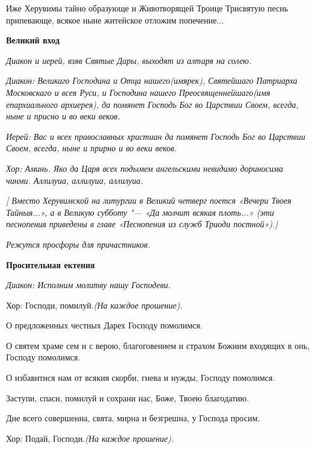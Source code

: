   Иже Херувимы тайно образующе и Животворящей Троице Трисвятую песнь припевающе, всякое ныне житейское отложим попечение... 


\medskip


\bfseries  Великий вход \normalfont{}\nopagebreak


\itshape  Диакон и иерей, взяв Святые Дары, выходят из алтаря на солею.\normalfont{}


\itshape  Диакон:\normalfont{} Великаго Господина и Отца нашего\itshape  (имярек),\normalfont{} Святейшаго Патриарха Московскаго и всея Руси, и Господина нашего Преосвященнейшаго\itshape  (имя епархиального архиерея),\normalfont{} да помянет Господь Бог во Царствии Своем, всегда, ныне и присно и во веки веков.


\itshape  Иерей:\normalfont{} Вас и всех православных христиан да помянет Господь Бог во Царствии Своем, всегда, ныне и прирно и во веки веков.


\itshape Хор:\normalfont{} Аминь. Яко да Царя всех подымем ангельскими невидимо дориносима чинми. Аллилуиа, аллилуиа, аллилуиа.


 \itshape  [ Вместо Херувимской на литургии в Великий четверг поется \normalfont{}«Вечери Твоея Тайныя..\itshape .», а в Великую субботу "--- \normalfont{}«Да молчит всякая плоть..\itshape .» (эти песнопения приведены в главе «Песнопения из служб Триоди постной»).]\normalfont{}



\itshape  Режутся просфоры для причастников\normalfont{}. 


\medskip


 \bfseries Просительная ектения \normalfont{}


\itshape  Диакон:\normalfont{} Исполним молитву нашу Господеви. \itshape 


  Хор:\normalfont{} Господи, помилуй.\itshape  (На каждое прошение\normalfont{}). 


  О предложенных честных Дарех Господу помолимся. 


  О святем храме сем и с верою, благоговением и страхом Божиим входящих в онь, Господу помолимся. 


  О избавитися нам от всякия скорби, гнева и нужды, Господу помолимся. 


  Заступи, спаси, помилуй и сохрани нас, Боже, Твоею благодатию. 


  Дне всего совершенна, свята, мирна и безгрешна, у Господа просим. \itshape 


  Хор:\normalfont{} Подай, Господи.\itshape  (На каждое прошение)\normalfont{}. 


